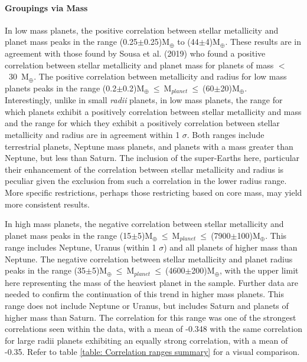 \documentclass[a4paper,twocolumn,12pt]{article}
\begin{document}
\paragraph{Groupings via Mass}
\vspace{-0.7em}
In low mass planets, the positive correlation between stellar metallicity and planet mass peaks in the range (0.25$\pm$0.25)M$_{\oplus}$ to (44$\pm$4)M$_{\oplus}$. These results are in agreement with those found by Sousa et al. (2019)\cite{Sousa.et.al.} who found a positive correlation between stellar metallicity and planet mass for planets of mass $<$~30~M$_\oplus$. The positive correlation between metallicity and radius for low mass planets peaks in the range (0.2$\pm$0.2)M$_{\oplus}~\leq~$M$_{planet}~\leq~$(60$\pm$20)M$_{\oplus}$.\\
Interestingly, unlike in small \textit{radii} planets, in low mass planets, the range for which planets exhibit a positively correlation between stellar metallicity and mass and the range for which they exhibit a positively correlation between stellar metallicity and radius are in agreement within 1 $\sigma$. Both ranges include terrestrial planets, Neptune mass planets, and planets with a mass greater than Neptune, but less than Saturn. The inclusion of the super-Earths here, particular their enhancement of the correlation between stellar metallicity and radius is peculiar given the exclusion from such a correlation in the lower radius range. More specific restrictions, perhaps those restricting based on core mass, may yield more consistent results.

In high mass planets, the negative correlation between stellar metallicity and planet mass peaks in the range (15$\pm$5)M$_{\oplus}~\leq~$M$_{planet}~\leq~$(7900$\pm$100)M$_{\oplus}$. This range includes Neptune, Uranus (within 1 $\sigma$) and all planets of higher mass than Neptune. The negative correlation between stellar metallicity and planet radius peaks in the range (35$\pm$5)M$_{\oplus}~\leq~$M$_{planet}~\leq~$(4600$\pm$200)M$_{\oplus}$, with the upper limit here representing the mass of the heaviest planet in the sample. Further data are needed to confirm the continuation of this trend in higher mass planets. This range does not include Neptune or Uranus, but includes Saturn and planets of higher mass than Saturn. The correlation for this range was one of the strongest correlations seen within the data, with a mean of -0.348 with the same correlation for large radii planets exhibiting an equally strong correlation, with a mean of -0.35. Refer to table \ref{table: Correlation ranges summary} for a visual comparison.
\end{document}
